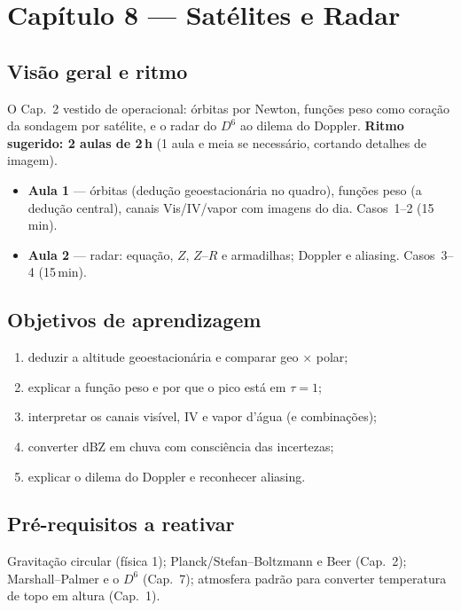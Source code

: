 \section{Capítulo 8 --- Satélites e Radar}

\subsection*{Visão geral e ritmo}

O Cap.~2 vestido de operacional: órbitas por Newton, funções peso como
coração da sondagem por satélite, e o radar do $D^6$ ao dilema do Doppler.
\textbf{Ritmo sugerido: 2 aulas de 2\,h} (1 aula e meia se necessário,
cortando detalhes de imagem).

\begin{itemize}
  \item \textbf{Aula 1} — órbitas (dedução geoestacionária no quadro),
        funções peso (a dedução central), canais Vis/IV/vapor com imagens
        do dia. Casos~1--2 (15\,min).
  \item \textbf{Aula 2} — radar: equação, $Z$, $Z$--$R$ e armadilhas;
        Doppler e aliasing. Casos~3--4 (15\,min).
\end{itemize}

\subsection*{Objetivos de aprendizagem}

\begin{enumerate}
  \item deduzir a altitude geoestacionária e comparar geo × polar;
  \item explicar a função peso e por que o pico está em $\tau = 1$;
  \item interpretar os canais visível, IV e vapor d'água (e combinações);
  \item converter dBZ em chuva com consciência das incertezas;
  \item explicar o dilema do Doppler e reconhecer aliasing.
\end{enumerate}

\subsection*{Pré-requisitos a reativar}

Gravitação circular (física 1); Planck/Stefan--Boltzmann e Beer (Cap.~2);
Marshall--Palmer e o $D^6$ (Cap.~7); atmosfera padrão para converter
temperatura de topo em altura (Cap.~1).

